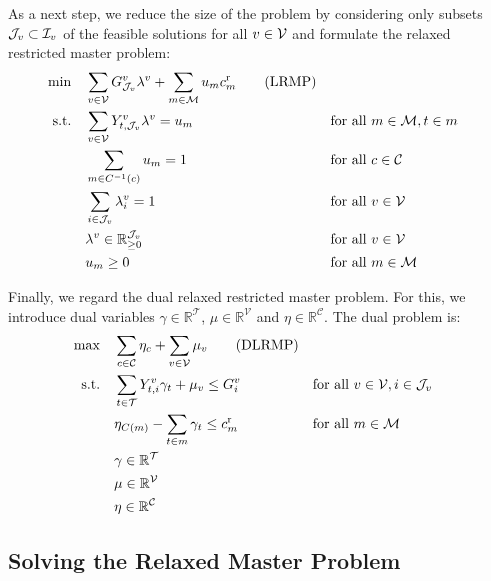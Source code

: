 As a next step, we reduce the size of the problem by considering only subsets $\mathcal{J}_v\subset\mathcal{I}_v$ of the feasible solutions for all $v\in\mathcal{V}$ and formulate the relaxed restricted master problem:  
\begin{align*}
	\min \quad & \sum_{v\in\mathcal{V}}G^v_{\mathcal{J}_v}\lambda^v + \sum_{m\in\mathcal{M}}u_mc^{\operatorname{r}}_m \tag{LRMP} \label{eq:LRMP} \\
	\text{s.t.} \quad & \sum_{v\in\mathcal{V}} Y^v_{t,\mathcal{J}_v}\lambda^v = u_m && \text{for all } m\in\mathcal{M},t\in m \\
	& \sum_{m\in C^{-1}(c)} u_m = 1 && \text{for all } c\in\mathcal{C} \\
	& \sum_{i\in\mathcal{J}_v}\lambda_i^v=1 && \text{for all } v\in\mathcal{V}\\
	& \lambda^v\in\mathbb{R}_{\geq 0}^{\mathcal{J}_v} && \text{for all } v\in\mathcal{V} \\
	& u_m\geq 0 && \text{for all } m\in\mathcal{M}
\end{align*}

Finally, we regard the dual relaxed restricted master problem. For this, we introduce dual variables $\gamma\in\mathbb{R}^{\mathcal{T}}$, $\mu\in\mathbb{R}^{\mathcal{V}}$ and $\eta\in\mathbb{R}^{\mathcal{C}}$. The dual problem is: 
\begin{align}
	\max \quad & \sum_{c\in\mathcal{C}}\eta_c + \sum_{v\in\mathcal{V}}\mu_v \tag{DLRMP} \label{eq:DLRMP} \\
	\text{s.t.} \quad & \sum_{t\in\mathcal{T}} Y^v_{t,i}\gamma_t + \mu_v \leq G^v_i && \text{for all } v\in\mathcal{V},i\in\mathcal{J}_v \label{eq:DLRMP:vehicle} \\
	& \eta_{C(m)} - \sum_{t\in m}\gamma_t \leq c^{\operatorname{r}}_m && \text{for all } m\in\mathcal{M} \label{eq:DLRMP:route} \\
	& \gamma\in\mathbb{R}^{\mathcal{T}} \nonumber \\
	& \mu\in\mathbb{R}^{\mathcal{V}} \nonumber \\
	& \eta\in\mathbb{R}^{\mathcal{C}} \nonumber
\end{align}


\subsection{Solving the Relaxed Master Problem}


